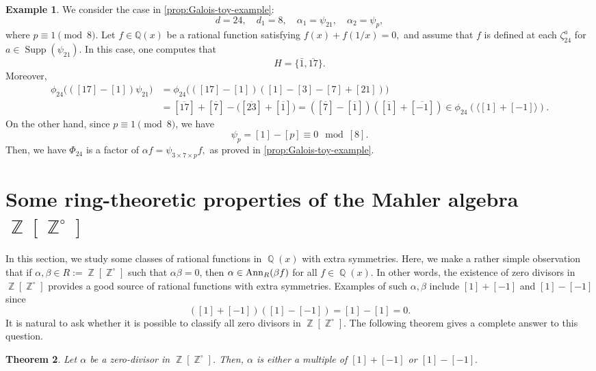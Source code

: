 \documentclass[12t,a4paper]{amsart}
\newtheorem{thm}{Theorem}[section]
\theoremstyle{definition}
\newtheorem{expl}[thm]{Example}
\DeclareMathOperator{\Z}{\mathbb{Z}}
\DeclareMathOperator{\Q}{\mathbb{Q}}
\DeclareMathOperator{\Supp}{\text{Supp}}
\newcommand{\Ann}{{\rm Ann}}
\numberwithin{equation}{section}
\begin{document}
{\begin{expl}
    We consider the case in \cref{prop:Galois-toy-example}: \[
d = 24, \quad d_1 = 8, \quad \alpha_1 = \psi_{21}, \quad \alpha_2 = \psi_p,
\]
where $p \equiv 1 \pmod{8}$. Let $f \in \mathbb{Q}(x)$ be a rational function satisfying $
f(x) + f(1/x) = 0,
$
and assume that $f$ is defined at each $\zeta_{24}^a$ for $a \in \Supp(\psi_{21})$. %
In this case, one computes that
\[
H = \{\bar{1}, \overline{17}\}.
\]
Moreover,
\begin{align*}
\phi_{24}\bigl(([17]-[1])\psi_{21}\bigr)
&= \phi_{24}\bigl(([17]-[1])([1] - [3] - [7] + [21])\bigr) \\
&= [\overline{17}] + [\overline{7}] - \bigl([\overline{23}] + [\overline{1}]\bigr) =([\overline{7}]-[\overline{1}])([\overline{1}]+[\overline{-1}]) \in \phi_{24}(\langle [1] + [-1] \rangle).
\end{align*}
On the other hand, since $p \equiv 1 \pmod{8}$, we have
\[
\psi_p = [1] - [p] \equiv 0 \mod{[8]}.
\]
Then, we have $\Phi_{24}$ is a factor of $\alpha f = \psi_{3 \times 7 \times p} f,$ as proved in \cref{prop:Galois-toy-example}.
\end{expl}







\appendix
\section{Some ring-theoretic properties of the Mahler algebra $\Z[\Z^{\circ}]$}
In this section, we study some classes of rational functions in $\Q(x)$ with extra symmetries. Here, we make a rather simple observation that if $\alpha, \beta \in R:=\Z[\Z^{\circ}]$ such that $\alpha \beta=0$, then $\alpha \in \Ann_{R}(\beta f)$ for all $f \in \Q(x).$ In other words, the existence of zero divisors in $\Z[\Z^{\circ}]$ provides a good source of rational functions with extra symmetries. Examples of such $\alpha, \beta$ include $[1]+[-1]$ and $[1]-[-1]$ since 
\[ ([1]+[-1])([1]-[-1])=[1]-[1]=0.\]
It is natural to ask whether it is possible to classify all zero divisors in $\Z[\Z^{\circ}]$. The following theorem gives a complete answer to this question. 

\begin{thm}\label{thm:zero_divisors} 
Let $\alpha$ be a zero-divisor in $\Z[\Z^{\circ}]$. Then, $\alpha$ is either a multiple of $[1]+[-1]$ or $[1]-[-1].$
\end{thm}

}
\end{document}
